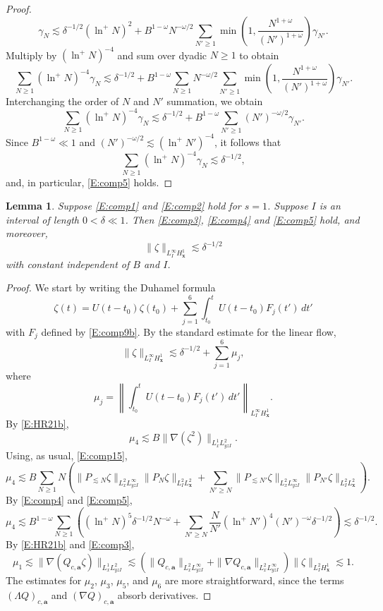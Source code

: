 \documentclass[12pt,letterpaper]{amsart}
\newtheorem{lemma}[theorem]{Lemma}
\theoremstyle{remark}
\numberwithin{equation}{section}
\numberwithin{theorem}{section}
\numberwithin{table}{section}
\begin{document}
\begin{proof}
$$
\gamma_N \lesssim \delta^{-1/2}(\ln^+ N)^2 +  B^{1-\omega} N^{-\omega/2} \sum_{N' \geq 1} \min( 1 , \frac{N^{1+\omega}}{(N')^{1+\omega}}) \gamma_{N'}.
$$
Multiply by $(\ln^+ N)^{-4}$ and sum over dyadic $N \geq 1$ to obtain
$$
\sum_{N \geq 1} (\ln^+ N)^{-4} \gamma_N \lesssim \delta^{-1/2} +  B^{1-\omega} \sum_{N \geq 1} N^{-\omega/2} \sum_{N' \geq 1} \min( 1 , \frac{N^{1+\omega}}{(N')^{1+\omega}}) \gamma_{N'}.
$$
Interchanging the order of $N$ and $N'$ summation, we obtain
$$
\sum_{N \geq 1} (\ln^+ N)^{-4} \gamma_N \lesssim \delta^{-1/2} +  B^{1-\omega} \sum_{N' \geq 1} (N')^{-\omega/2} \gamma_{N'}.
$$
Since $B^{1-\omega} \ll 1$ and $(N')^{-\omega/2} \lesssim (\ln^+ N')^{-4}$, it follows that
$$
\sum_{N \geq 1} (\ln^+ N)^{-4} \gamma_N \lesssim \delta^{-1/2},
$$ 
and, in particular, \eqref{E:comp5} holds.
\end{proof}

\begin{lemma}
\label{L:comp4}
Suppose  \eqref{E:comp1} and \eqref{E:comp2} hold for $s=1$.  Suppose $I$ is an interval of length $0<\delta \ll 1$.   Then \eqref{E:comp3}, \eqref{E:comp4} and \eqref{E:comp5} hold, and moreover,
$$
\| \zeta \|_{L_I^\infty H_{\mathbf{x}}^1} \lesssim \delta^{-1/2}
$$
with constant independent of $B$ and $I$.
\end{lemma}
\begin{proof}
We start by writing the Duhamel formula
$$
\zeta(t) = U(t-t_0) \zeta(t_0) + \sum_{j=1}^6 \int_{t_0}^t U(t-t_0) F_j(t') \, dt'
$$
with $F_j$ defined by \eqref{E:comp9b}.   By the standard estimate for the linear flow,
$$
\| \zeta \|_{L_I^\infty H_{\mathbf{x}}^1} \lesssim \delta^{-1/2} + \sum_{j=1}^6 \mu_j,
$$
where
$$
\mu_j = \left\| \int_{t_0}^t U(t-t_0) F_j(t') \, dt' \right\|_{L_I^\infty H_{\mathbf{x}}^1}.
$$
By \eqref{E:HR21b},
$$
\mu_4 \lesssim B\| \nabla( \zeta^2) \|_{L_x^1 L_{y z I}^2}.
$$
Using, as usual, \eqref{E:comp15},
$$
\mu_4 \lesssim B \sum_{N \geq 1} N \left( \| P_{\lesssim N} \zeta \|_{L_x^2 L_{y z I}^\infty} \|P_N \zeta \|_{L_I^2 L_\mathbf{x}^2} + \sum_{N' \geq N}  \| P_{\lesssim N'} \zeta \|_{L_x^2 L_{y z I}^\infty} \|P_{N'} \zeta \|_{L_I^2 L_\mathbf{x}^2} \right).
$$
By  \eqref{E:comp4} and \eqref{E:comp5},
$$
\mu_4 \lesssim B^{1-\omega} \sum_{N\geq 1} \left(  (\ln^+ N)^5 \delta^{-1/2} N^{-\omega} + \sum_{N'\geq N} \frac{N}{N'} (\ln^+ N')^4 (N')^{-\omega} \delta^{-1/2} \right) \lesssim \delta^{-1/2}.
$$
By \eqref{E:HR21b} and \eqref{E:comp3},
$$
\mu_1 \lesssim \| \nabla (Q_{c,\mathbf{a}} \zeta) \|_{L_x^1 L_{y z I}^2} \lesssim (\|Q_{c,\mathbf{a}} \|_{L_x^2 L_{y z I}^\infty} +\|\nabla Q_{c,\mathbf{a}} \|_{L_x^2 L_{y z I}^\infty}) \|\zeta \|_{L_I^2 H_{\mathbf{x}}^1}  \lesssim 1.
$$
The estimates for $\mu_2$, $\mu_3$, $\mu_5$, and $\mu_6$ are more straightforward, since the terms $(\Lambda Q)_{c,\mathbf{a}}$ and  $(\nabla Q)_{c,\mathbf{a}}$ absorb derivatives.
\end{proof}
\end{document}
